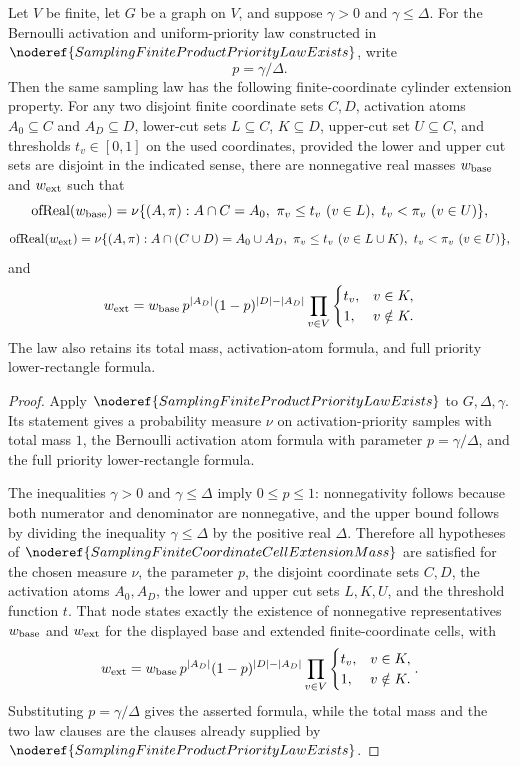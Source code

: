 \begin{helper}
Let \(V\) be finite, let \(G\) be a graph on \(V\), and suppose
\(\gamma>0\) and \(\gamma\le\Delta\).  For the Bernoulli activation and
uniform-priority law constructed in
\(\noderef{SamplingFiniteProductPriorityLawExists}\), write
\[
  p=\gamma/\Delta .
\]
Then the same sampling law has the following finite-coordinate cylinder
extension property.  For any two disjoint finite coordinate sets \(C,D\),
activation atoms \(A_0\subseteq C\) and \(A_D\subseteq D\), lower-cut sets
\(L\subseteq C\), \(K\subseteq D\), upper-cut set \(U\subseteq C\), and
thresholds \(t_v\in[0,1]\) on the used coordinates, provided the lower and
upper cut sets are disjoint in the indicated sense, there are nonnegative
real masses \(w_{\rm base}\) and \(w_{\rm ext}\) such that
\[
\operatorname{ofReal}(w_{\rm base})
 = \nu\{(A,\pi):A\cap C=A_0,\ \pi_v\le t_v\ (v\in L),\
        t_v<\pi_v\ (v\in U)\},
\]
\[
\operatorname{ofReal}(w_{\rm ext})
 = \nu\{(A,\pi):A\cap(C\cup D)=A_0\cup A_D,\
        \pi_v\le t_v\ (v\in L\cup K),\
        t_v<\pi_v\ (v\in U)\},
\]
and
\[
  w_{\rm ext}
  =
  w_{\rm base}\,
  p^{|A_D|}(1-p)^{|D|-|A_D|}
  \prod_{v\in V}\begin{cases}t_v,&v\in K,\\1,&v\notin K.\end{cases}
\]
The law also retains its total mass, activation-atom formula, and full
priority lower-rectangle formula.
\end{helper}
\begin{proof}
Apply \(\noderef{SamplingFiniteProductPriorityLawExists}\) to
\(G,\Delta,\gamma\).  Its statement gives a probability measure \(\nu\) on
activation-priority samples with total mass \(1\), the Bernoulli activation
atom formula with parameter \(p=\gamma/\Delta\), and the full priority
lower-rectangle formula.

The inequalities \(\gamma>0\) and \(\gamma\le\Delta\) imply
\(0\le p\le 1\): nonnegativity follows because both numerator and denominator
are nonnegative, and the upper bound follows by dividing the inequality
\(\gamma\le\Delta\) by the positive real \(\Delta\).  Therefore all
hypotheses of \(\noderef{SamplingFiniteCoordinateCellExtensionMass}\) are
satisfied for the chosen measure \(\nu\), the parameter \(p\), the disjoint
coordinate sets \(C,D\), the activation atoms \(A_0,A_D\), the lower and
upper cut sets \(L,K,U\), and the threshold function \(t\).  That node states
exactly the existence of nonnegative representatives \(w_{\rm base}\) and
\(w_{\rm ext}\) for the displayed base and extended finite-coordinate cells,
with
\[
  w_{\rm ext}
  =
  w_{\rm base}\,
  p^{|A_D|}(1-p)^{|D|-|A_D|}
  \prod_{v\in V}\begin{cases}t_v,&v\in K,\\1,&v\notin K.\end{cases}.
\]
Substituting \(p=\gamma/\Delta\) gives the asserted formula, while the total
mass and the two law clauses are the clauses already supplied by
\(\noderef{SamplingFiniteProductPriorityLawExists}\).
\end{proof}
